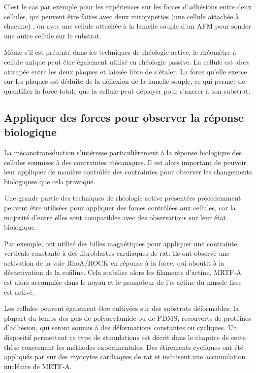 \documentclass{report}
\begin{document}
C'est le cas par exemple pour les expériences sur les forces d'adhésions entre deux cellules, qui peuvent être faites avec deux miropipettes (une cellule attachée à chacune) \cite{biro}, ou avec une cellule attachée à la lamelle souple d'un AFM pour sonder une autre cellule sur le substrat. 

Même s'il est présenté dans les techniques de rhéologie active, le rhéomètre à cellule unique peut être également utilisé en rhéologie passive. 
La cellule est alors attrapée entre les deux plaques et laissée libre de s'étaler. La force qu'elle exerce sur les plaques est déduite de la déflexion de la lamelle souple, ce qui permet de quantifier la force totale que la cellule peut déployer pour s'ancrer à son substrat. 

\subsection{Appliquer des forces pour observer la réponse biologique}

La mécanotransduction s'intéresse particulièrement à la réponse biologique des cellules soumises à des contraintes mécaniques. 
Il est alors important de pouvoir leur appliquer de manière contrôlée des contraintes pour observer les changements biologiques que cela provoque. 

Une grande partie des techniques de rhéologie active présentées précédemment peuvent être utilisées pour appliquer des forces contrôlées aux cellules, car la majorité d'entre elles sont compatibles avec des observations sur leur état biologique.

Par exemple,\cite{zhao_force_2007} ont utilisé des billes magnétiques pour appliquer une contrainte verticale constante à des fibroblastes cardiaques de rat. Ils ont observé une activation de la voie RhoA/ROCK en réponse à la force, qui aboutit à la désactivation de la cofiline. Cela stabilise alors les filaments d'actine, MRTF-A est alors accumulée dans le noyau et le promoteur de l'$\alpha$-actine  du muscle lisse est activé. 

Les cellules peuvent également être cultivées sur des substrats déformables, la plupart du temps des gels de polyacylamide ou de PDMS, recouverts de protéines d'adhésion, qui seront soumis à des déformations constantes ou cycliques. Un dispositif permettant ce type de stimulations est décrit dans le chapitre de cette thèse concernant les méthodes expérimentales. 
Des étirements cycliques ont été appliqués par \cite{kuwahara_myocardin-related_2010} sur des myocytes cardiaques de rat et induisent une accumulation nucléaire de MRTF-A.  
\end{document}
